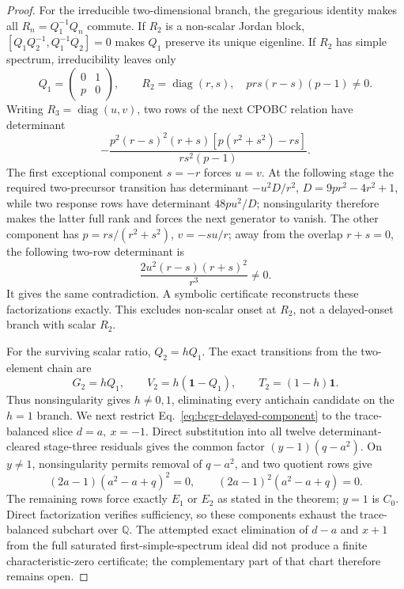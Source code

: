 \begin{proof}
For the irreducible two-dimensional branch, the gregarious identity makes
all \(R_n=Q_1^{-1}Q_n\) commute.  If \(R_2\) is a non-scalar Jordan block,
\([Q_1Q_2^{-1},Q_1^{-1}Q_2]=0\) makes \(Q_1\) preserve its unique
eigenline.  If \(R_2\) has simple spectrum, irreducibility leaves only
\[
 Q_1=\begin{pmatrix}0&1\\p&0\end{pmatrix},\qquad
 R_2=\operatorname{diag}(r,s),
\quad prs(r-s)(p-1)\ne0 .
\]
Writing \(R_3=\operatorname{diag}(u,v)\), two rows of the next CPOBC
relation have determinant
\begin{equation}
 -\frac{p^2(r-s)^2(r+s)[p(r^2+s^2)-rs]}
 {rs^2(p-1)}.
\label{eq:bcgr-early-irred}
\end{equation}
The first exceptional component \(s=-r\) forces \(u=v\).  At the following
stage the required two-precursor transition has determinant
\(-u^2D/r^2\), \(D=9pr^2-4r^2+1\), while two response rows have determinant
\(48pu^2/D\); nonsingularity therefore makes the latter full rank and
forces the next generator to vanish.  The other component has
\(p=rs/(r^2+s^2)\), \(v=-su/r\); away from the overlap \(r+s=0\), the
following two-row determinant is
\[
 \frac{2u^2(r-s)(r+s)^2}{r^3}\ne0.
\]
It gives the same contradiction.  A symbolic certificate reconstructs
these factorizations exactly.  This excludes non-scalar onset at \(R_2\),
not a delayed-onset branch with scalar \(R_2\).

For the surviving scalar ratio, \(Q_2=hQ_1\).  The exact transitions from
the two-element chain are
\begin{equation}
 G_2=hQ_1,\qquad V_2=h(\mathbf1-Q_1),\qquad
 T_2=(1-h)\mathbf1 .
\label{eq:bcgr-delayed-chain}
\end{equation}
Thus nonsingularity gives \(h\ne0,1\), eliminating every antichain
candidate on the \(h=1\) branch.  We next restrict
Eq.~\eqref{eq:bcgr-delayed-component} to the trace-balanced slice
\(d=a,\ x=-1\).  Direct substitution into all twelve
determinant-cleared stage-three residuals gives the common factor
\((y-1)(q-a^2)\).  On \(y\ne1\), nonsingularity permits removal of
\(q-a^2\), and two quotient rows give
\[
(2a-1)(a^2-a+q)^2=0,\qquad
(2a-1)^2(a^2-a+q)=0.
\]
The remaining rows force exactly \(E_1\) or \(E_2\) as stated in the
theorem; \(y=1\) is \(C_0\).  Direct factorization verifies sufficiency, so
these components exhaust the trace-balanced subchart over
\(\mathbb Q\).  The attempted exact elimination of \(d-a\) and \(x+1\)
from the full saturated first-simple-spectrum ideal did not produce a
finite characteristic-zero certificate; the complementary part of that
chart therefore remains open.


\end{proof}
